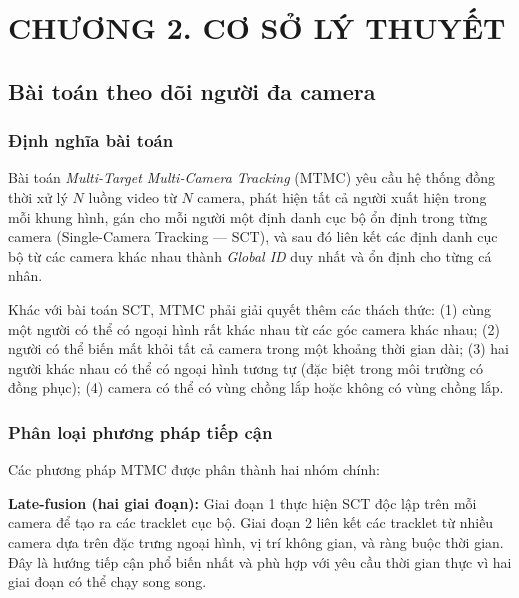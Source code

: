 \documentclass{article} %
\begin{document}
\newpage

\section*{CHƯƠNG 2.  CƠ SỞ LÝ THUYẾT}
\setcounter{section}{2}
\setcounter{subsection}{0}
\setcounter{figure}{0}
\setcounter{table}{0}

\subsection{Bài toán theo dõi người đa camera}

\subsubsection{Định nghĩa bài toán}

Bài toán \textit{Multi-Target Multi-Camera Tracking} (MTMC) yêu cầu hệ thống đồng thời xử lý $N$ luồng video từ $N$ camera, phát hiện tất cả người xuất hiện trong mỗi khung hình, gán cho mỗi người một định danh cục bộ ổn định trong từng camera (Single-Camera Tracking --- SCT), và sau đó liên kết các định danh cục bộ từ các camera khác nhau thành \textit{Global ID} duy nhất và ổn định cho từng cá nhân.

Khác với bài toán SCT, MTMC phải giải quyết thêm các thách thức: (1) cùng một người có thể có ngoại hình rất khác nhau từ các góc camera khác nhau; (2) người có thể biến mất khỏi tất cả camera trong một khoảng thời gian dài; (3) hai người khác nhau có thể có ngoại hình tương tự (đặc biệt trong môi trường có đồng phục); (4) camera có thể có vùng chồng lắp hoặc không có vùng chồng lắp.

\subsubsection{Phân loại phương pháp tiếp cận}

Các phương pháp MTMC được phân thành hai nhóm chính:

\textbf{Late-fusion (hai giai đoạn):} Giai đoạn 1 thực hiện SCT độc lập trên mỗi camera để tạo ra các tracklet cục bộ. Giai đoạn 2 liên kết các tracklet từ nhiều camera dựa trên đặc trưng ngoại hình, vị trí không gian, và ràng buộc thời gian. Đây là hướng tiếp cận phổ biến nhất và phù hợp với yêu cầu thời gian thực vì hai giai đoạn có thể chạy song song.
\end{document}
